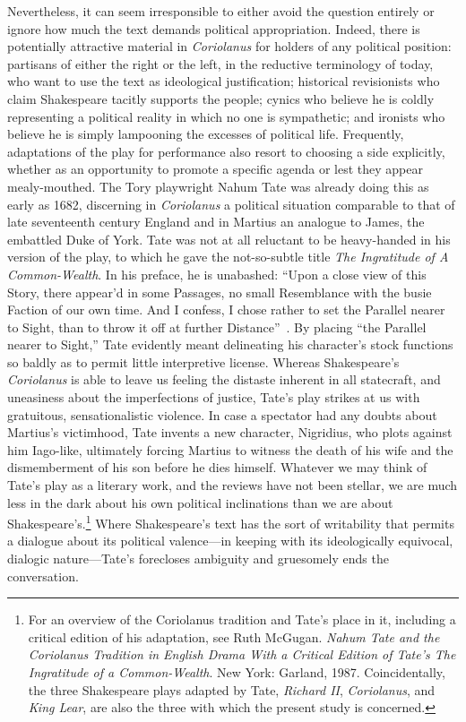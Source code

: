 Nevertheless, it can seem irresponsible to either avoid the question entirely or ignore how much the text demands political appropriation.
Indeed, there is potentially attractive material in \emph{Coriolanus} for holders of any political position: partisans of either the right or the left, in the reductive terminology of today, who want to use the text as ideological justification; historical revisionists who claim Shakespeare tacitly supports the people; cynics who believe he is coldly representing a political reality in which no one is sympathetic; and ironists who believe he is simply lampooning the excesses of political life.
Frequently, adaptations of the play for performance also resort to choosing a side explicitly, whether as an opportunity to promote a specific agenda or lest they appear mealy-mouthed.
The Tory playwright Nahum Tate was already doing this as early as 1682, discerning in \emph{Coriolanus} a political situation comparable to that of late seventeenth century England and in Martius an analogue to James, the embattled Duke of York.
Tate was not at all reluctant to be heavy-handed in his version of the play, to which he gave the not-so-subtle title \emph{The Ingratitude of A Common-Wealth}.
In his preface, he is unabashed: ``Upon a close view of this Story, there appear'd in some Passages, no small Resemblance with the busie Faction of our own time.
And I confess, I chose rather to set the Parallel nearer to Sight, than to throw it off at further Distance''~\cite[3]{tate_dedication_1995}.
By placing ``the Parallel nearer to Sight,'' Tate evidently meant delineating his character's stock functions so baldly as to permit little interpretive license.
Whereas Shakespeare's \emph{Coriolanus} is able to leave us feeling the distaste inherent in all statecraft, and uneasiness about the imperfections of justice, Tate's play strikes at us with gratuitous, sensationalistic violence.
In case a spectator had any doubts about Martius's victimhood, Tate invents a new character, Nigridius, who plots against him Iago-like, ultimately forcing Martius to witness the death of his wife and the dismemberment of his son before he dies himself.
Whatever we may think of Tate's play as a literary work, and the reviews have not been stellar, we are much less in the dark about his own political inclinations than we are about Shakespeare's.\footnote{For an overview of the Coriolanus tradition and Tate's place in it, including a critical edition of his adaptation, see Ruth McGugan. \emph{Nahum Tate and the Coriolanus Tradition in English Drama With a Critical Edition of Tate's The Ingratitude of a Common-Wealth}. New York: Garland, 1987. \nocite{mcgugan_nahum_1987}
Coincidentally, the three Shakespeare plays adapted by Tate, \emph{Richard II}, \emph{Coriolanus}, and \emph{King Lear}, are also the three with which the present study is concerned.}
Where Shakespeare's text has the sort of writability that permits a dialogue about its political valence---in keeping with its ideologically equivocal, dialogic nature---Tate's forecloses ambiguity and gruesomely ends the conversation.

